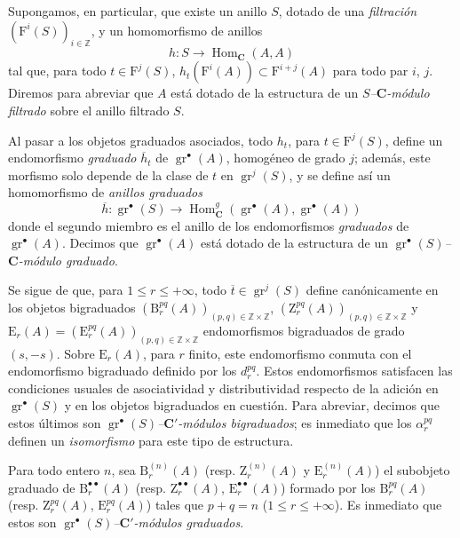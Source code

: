 \begin{env}[13.6.6]
\label{0.13.6.6}
\label{0.13.6.6-fr}
Supongamos, en particular, que existe un anillo $S$, dotado de una
\emph{filtración} $(\mathrm F^i(S))_{i\in\mathbb Z}$, y un homomorfismo
de anillos
\begin{equation}
\label{0.13.6.6.1-fr}
\tag{13.6.6.1}
h:S\to\operatorname{Hom}_{\boldsymbol{C}}(A,A)
\end{equation}
tal que, para todo $t\in\mathrm F^j(S)$,
$h_t(\mathrm F^i(A))\subset\mathrm F^{i+j}(A)$ para todo par $i$, $j$. Diremos para abreviar que $A$ está dotado de la estructura de un
\emph{$S$--$\boldsymbol{C}$-módulo filtrado} sobre el anillo filtrado $S$.

Al pasar a los objetos graduados asociados, todo $h_t$, para
$t\in\mathrm F^j(S)$, define un endomorfismo \emph{graduado}
$\overline h_t$ de $\operatorname{gr}^\bullet(A)$, homogéneo de grado $j$; además, este morfismo solo depende de la clase de $t$ en $\operatorname{gr}^j(S)$, y se define así un homomorfismo de \emph{anillos graduados} \[
\overline h:\operatorname{gr}^\bullet(S)\to
\operatorname{Hom}_{\boldsymbol{C}}^g(\operatorname{gr}^\bullet(A),
\operatorname{gr}^\bullet(A))
\] donde el segundo miembro es el anillo de los endomorfismos \emph{graduados} de $\operatorname{gr}^\bullet(A)$.
Decimos que $\operatorname{gr}^\bullet(A)$ está dotado de la estructura
de un \emph{$\operatorname{gr}^\bullet(S)$--$\boldsymbol{C}$-módulo graduado}.

Se sigue de  que, para
$1\leq r\leq+\infty$, todo $\overline t\in\operatorname{gr}^j(S)$ define canónicamente en los objetos bigraduados $(\mathrm B_r^{pq}(A))_{(p,q)\in\mathbb Z\times\mathbb Z}$, $(\mathrm Z_r^{pq}(A))_{(p,q)\in\mathbb Z\times\mathbb Z}$ y $\mathrm E_r(A)=(\mathrm E_r^{pq}(A))_{(p,q)\in\mathbb Z\times\mathbb Z}$
endomorfismos bigraduados de grado $(s,-s)$.
Sobre $\mathrm E_r(A)$, para $r$ finito, este endomorfismo conmuta con
el endomorfismo bigraduado definido por los $d_r^{pq}$.
Estos endomorfismos satisfacen las condiciones usuales de asociatividad y
distributividad respecto de la adición en
$\operatorname{gr}^\bullet(S)$ y en los objetos bigraduados en cuestión.
Para abreviar, decimos que estos últimos son
\emph{$\operatorname{gr}^\bullet(S)$--$\boldsymbol{C}'$-módulos bigraduados};
es inmediato que los $\alpha_r^{pq}$ definen un \emph{isomorfismo} para
este tipo de estructura.

Para todo entero $n$, sea $\mathrm B_r^{(n)}(A)$
(resp. $\mathrm Z_r^{(n)}(A)$ y
$\mathrm E_r^{(n)}(A)$) el subobjeto graduado de $\mathrm B_r^{\bullet\bullet}(A)$ (resp. $\mathrm Z_r^{\bullet\bullet}(A)$, $\mathrm E_r^{\bullet\bullet}(A)$) formado por los $\mathrm B_r^{pq}(A)$ (resp. $\mathrm Z_r^{pq}(A)$, $\mathrm E_r^{pq}(A)$) tales que $p+q=n$ ($1\leq r\leq+\infty$).
Es inmediato que estos son
\emph{$\operatorname{gr}^\bullet(S)$--$\boldsymbol{C}'$-módulos graduados}.


\end{env}
